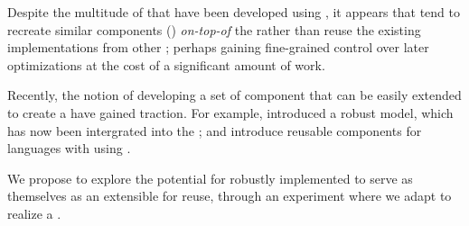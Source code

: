 Despite the multitude of \tvms{} that have been developed using \vmframeworks{}, it appears that \languageDevs{} tend to recreate similar components (\listVmComponents{}) \emph{on-top-of} the \framework{} rather than reuse the existing implementations from other \tvms{}; perhaps gaining fine-grained control over later optimizations at the cost of a significant amount of work.


Recently, the notion of developing a set of component that can be easily extended to create a \tvm{} have gained traction. For example,  introduced a robust \objectstorage{} model, which has now been intergrated into the \Truffle{} \framework{}; and  introduce reusable components for languages with \denotationalSemantics{} using \emph{\ObjectAlgebras{}} .

We propose to explore the potential for robustly implemented \tvms{} to serve as themselves as an extensible \frameworks{} for reuse, through an experiment where we adapt \textsc{\SOMns{}} to realize a \GraceVM{}.


%









% 
